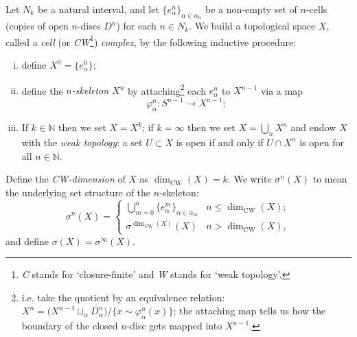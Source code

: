 \documentclass[12pt]{article}
\numberwithin{equation}{subsection}
\numberwithin{theorem}{subsection}
\numberwithin{lemma}{subsection}
\numberwithin{corollary}{subsection}
\numberwithin{definition}{subsection}
\numberwithin{example}{subsection}
\numberwithin{note}{subsection}
\newcommand{\nn}{\mathbb{N}}
\begin{document}
\begin{appendices}
            \begin{definition}[CW complex]
                Let $N_k$ be a natural interval, and let $\{e_\alpha^n\}_{\alpha\in \alpha_n}$ be a non-empty set of $n$-cells (copies of open $n$-discs $D^n$) for each $n\in N_k$.
                We build a topological space $X$, called a \emph{cell} (or \emph{CW}\footnote{
                    \emph{C} stands for `closure-finite' and \emph{W} stands for `weak topology'.
                }) \emph{complex}, by the following inductive procedure:
                \begin{enumerate}[(i)]
                    \item define $X^0=\{e_\alpha^0\}$;
                    \item define the \emph{$n$-skeleton $X^n$} by attaching\footnote{
                        i.e. take the quotient by an equivalence relation: $X^n=\big(X^{n-1}\sqcup_\alpha \overline{D_\alpha^n}\big)/\{x\sim\varphi_\alpha^n(x)\}$; the attaching map tells us how the boundary of the closed $n$-disc gets mapped into $X^{n-1}$.
                    } each $e_\alpha^n$ to $X^{n-1}$ via a map
                        \begin{equation*}
                            \varphi_\alpha^n\colon S^{n-1}\to X^{n-1};
                        \end{equation*}
                    \item If $k\in\nn$ then we set $X=X^k$; if $k=\infty$ then we set $X=\bigcup_n X^n$ and endow $X$ with the \emph{weak topology}: a set $U\subset X$ is open if and only if $U\cap X^n$ is open for all $n\in\nn$.
                \end{enumerate}
                Define the \emph{CW-dimension} of $X$ as \mbox{$\dim_\text{CW}(X)=k$}.
                We write $\sigma^n(X)$ to mean the underlying set structure of the $n$-skeleton:
                \begin{equation*}
                    \sigma^n(X) =
                    \begin{cases}
                        \bigcup_{m=0}^n\{e_\alpha^m\}_{\alpha\in\alpha_m} & n\leqslant\dim_\text{CW}(X);\\[.2cm]
                        \sigma^{\dim_\text{CW}(X)}(X) & n>\dim_\text{CW}(X),
                    \end{cases}
                \end{equation*}
                and define $\sigma(X)=\sigma^\infty(X)$.
            \end{definition}


\end{appendices}
\end{document}
